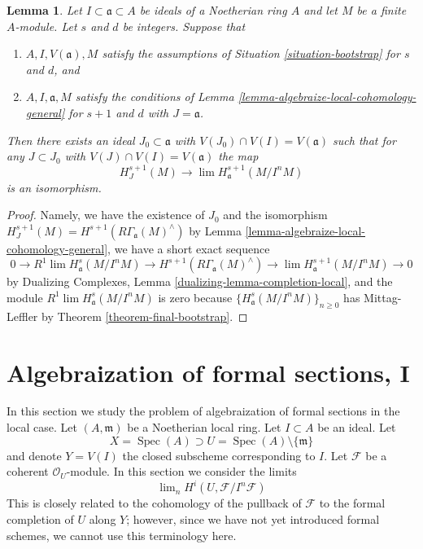 \documentclass{stacks-project}
\theoremstyle{plain}
\newtheorem{lemma}[subsection]{Lemma}
\theoremstyle{definition}
\theoremstyle{remark}
\numberwithin{equation}{subsection}
\def\lim{\mathop{\mathrm{lim}}\nolimits}
\def\Spec{\mathop{\mathrm{Spec}}}
\begin{document}
\begin{lemma}
\label{lemma-combine-two}
Let $I \subset \mathfrak a \subset A$ be ideals of a Noetherian ring $A$
and let $M$ be a finite $A$-module. Let $s$ and $d$ be integers.
Suppose that
\begin{enumerate}
\item $A, I, V(\mathfrak a), M$ satisfy the assumptions of
Situation \ref{situation-bootstrap} for $s$ and $d$, and
\item $A, I, \mathfrak a, M$ satisfy the conditions of
Lemma \ref{lemma-algebraize-local-cohomology-general}
for $s + 1$ and $d$ with $J = \mathfrak a$.
\end{enumerate}
Then there exists an ideal
$J_0 \subset \mathfrak a$ with $V(J_0) \cap V(I) = V(\mathfrak a)$
such that for any $J \subset J_0$ with $V(J) \cap V(I) = V(\mathfrak a)$
the map
$$
H^{s + 1}_J(M) \longrightarrow \lim H^{s + 1}_\mathfrak a(M/I^nM)
$$
is an isomorphism.
\end{lemma}

\begin{proof}
Namely, we have the existence of $J_0$
and the isomorphism
$H^{s + 1}_J(M) = H^{s + 1}(R\Gamma_\mathfrak a(M)^\wedge)$
by Lemma \ref{lemma-algebraize-local-cohomology-general},
we have a short exact sequence
$$
0 \to R^1\lim H^s_\mathfrak a(M/I^nM) \to
H^{s + 1}(R\Gamma_\mathfrak a(M)^\wedge) \to
\lim H^{s + 1}_\mathfrak a(M/I^nM) \to 0
$$
by Dualizing Complexes, Lemma \ref{dualizing-lemma-completion-local},
and the module $R^1\lim H^s_\mathfrak a(M/I^nM)$ is zero because
$\{H^s_\mathfrak a(M/I^nM)\}_{n \geq 0}$ has Mittag-Leffler
by Theorem \ref{theorem-final-bootstrap}.
\end{proof}








\section{Algebraization of formal sections, I}
\label{section-algebraization-sections}

\noindent
In this section we study the problem of algebraization of
formal sections in the local case.
Let $(A, \mathfrak m)$ be a Noetherian local ring.
Let $I \subset A$ be an ideal. Let
$$
X = \Spec(A) \supset U = \Spec(A) \setminus \{\mathfrak m\}
$$
and denote $Y = V(I)$ the closed subscheme corresponding to $I$.
Let $\mathcal{F}$ be a coherent $\mathcal{O}_U$-module.
In this section we consider the limits
$$
\lim_n H^i(U, \mathcal{F}/I^n\mathcal{F})
$$
This is closely related to the cohomology of the pullback
of $\mathcal{F}$ to the formal completion of $U$ along $Y$;
however, since we have not yet introduced formal schemes,
we cannot use this terminology here.
\end{document}
